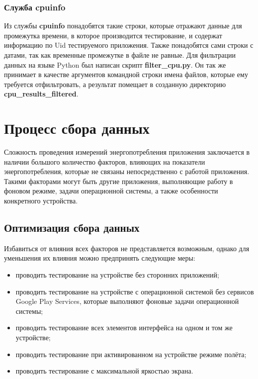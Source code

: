 \documentclass[a4paper,14pt]{extarticle} %
\begin{document}
	\subsubsection{Служба cpuinfo}
	
	Из службы \textbf{cpuinfo} понадобятся такие строки, которые отражают данные для промежутка времени, в которое производится тестирование, и содержат информацию по Uid тестируемого приложения. Также понадобятся сами строки с датами, так как временные промежутке в файле не равные. Для фильтрации данных на языке Python был написан скрипт \textbf{filter\_cpu.py}. Он так же принимает в качестве аргументов командной строки имена файлов, которые ему требуется отфильтровать, а результат помещает в созданную директорию \textbf{cpu\_results\_filtered}.

	\newpage
	\section{Процесс сбора данных}
	
	Сложность проведения измерений энергопотребления приложения заключается в наличии большого количество факторов, влияющих на показатели энергопотребления, которые не связаны непосредственно с работой приложения. Такими факторами могут быть другие приложения, выполняющие работу в фоновом режиме, задачи операционной системы, а также особенности конкретного устройства.
	
	\subsection{Оптимизация сбора данных} \label{sub:optimization}
	
	 Избавиться от влияния всех факторов не представляется возможным, однако для уменьшения их влияния можно предпринять следующие меры:
	\begin{itemize}
		\item проводить тестирование на устройстве без сторонних приложений;
		\item проводить тестирование на устройстве с операционной системой без сервисов Google Play Services, которые выполняют фоновые задачи операционной системы;
		\item проводить тестирование всех элементов интерфейса на одном и том же устройстве;
		\item проводить тестирование при активированном на устройстве режиме полёта;
		\item проводить тестирование с максимальной яркостью экрана.
	\end{itemize}
\end{document}
